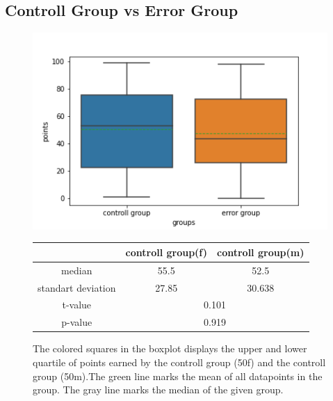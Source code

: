 \documentclass[runningheads]{llncs}
\begin{document}
\subsection{Controll Group vs Error Group}
\begin{figure}
    \begin{minipage}{0.45\textwidth}        
        \includegraphics[width=\textwidth]{code/generate/all.png}
        \caption{The colored squares in the boxplot displays
        the upper and lower quartile of points earned by the controll group (50f) and
        the controll group (50m).The green line marks the mean of all datapoints in the group.
        The gray line marks the median  of the given group.} \label{fig5}
    \end{minipage}
\hfill
\begin{minipage}{0.45\textwidth}
\begin{tabular}[]{| c | c | c |}
        \hline
        & controll group(f) & controll group(m) \\
        \hline
        median & 55.5&52.5 \\
        \hline
        standart deviation & 27.85&30.638 \\
        \hline
        t-value & \multicolumn{2}{c|}{0.101} \\
        \hline
        p-value & \multicolumn{2}{c|}{0.919} \\
        \hline            
\end{tabular}
\end{minipage}
\end{figure}
\end{document}

